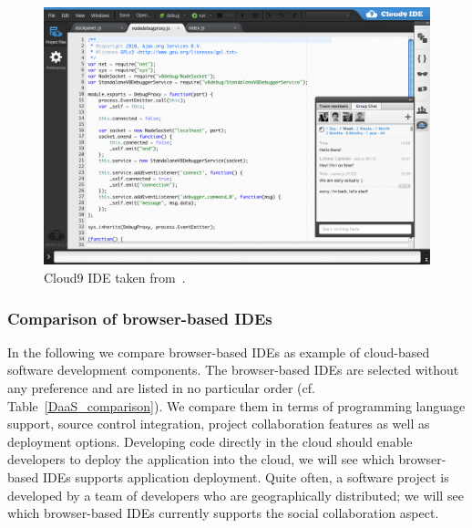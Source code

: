 \documentclass[11pt,fleqn,twoside]{article}
\begin{document}

\begin{figure}[h]
\begin{center}
\includegraphics[width=0.8\columnwidth]{fig/Cloud9}
\end{center}
\vspace*{-4ex}
\caption{Cloud9 IDE taken from~\cite{cloud9IDE_url}.}
\label{fig:Cloud9}
\end{figure}

\subsubsection{Comparison of browser-based IDEs}

In the following we compare browser-based IDEs as example of cloud-based software development components. The browser-based IDEs are selected without any preference and are listed in no particular order (cf. Table~\ref{DaaS_comparison}). We compare them in terms of programming language support, source control integration, project collaboration features as well as deployment options. Developing code directly in the cloud should enable developers to deploy the application into the cloud, we will see which browser-based IDEs supports application deployment. Quite often, a software project is developed by a team of developers who are geographically distributed; we will see which browser-based IDEs currently supports the social collaboration aspect.
\end{document}
